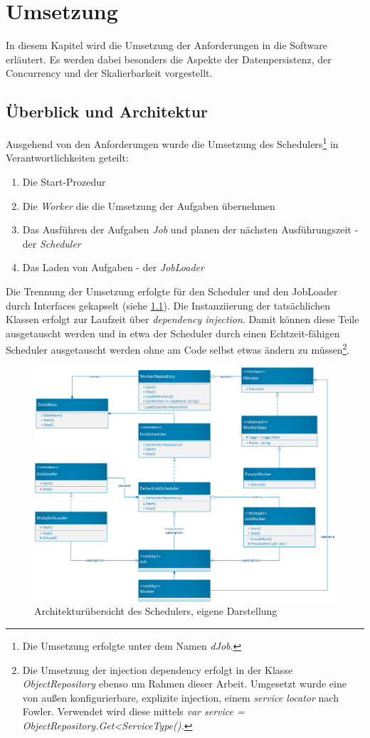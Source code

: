 \chapter{Umsetzung}\label{chap:Umsetzung}
\chapterstart
In diesem Kapitel wird die Umsetzung der Anforderungen in die Software erläutert. Es werden dabei besonders die Aspekte der Datenpersistenz, der Concurrency und der Skalierbarkeit vorgestellt.
\section{Überblick und Architektur}
Ausgehend von den Anforderungen wurde die Umsetzung des Schedulers\footnote{Die Umsetzung erfolgte unter dem Namen \textit{dJob}.} in Verantwortlichkeiten geteilt:
\begin{enumerate}
	\item Die Start-Prozedur
	\item Die \textit{Worker} die die Umsetzung der Aufgaben übernehmen
	\item Das Ausführen der Aufgaben \textit{Job} und planen der nächsten Ausführungszeit - der \textit{Scheduler}
	\item Das Laden von Aufgaben - der \textit{JobLoader}
\end{enumerate}
Die Trennung der Umsetzung erfolgte für den Scheduler und den JobLoader durch Interfaces gekapselt (siehe \ref{fig:architecture}). Die Instanziierung der tatsächlichen Klassen erfolgt zur Laufzeit über \textit{dependency injection}\cite{fowler2004}. Damit können diese Teile ausgetauscht werden und in etwa der Scheduler durch einen Echtzeit-fähigen Scheduler ausgetauscht werden ohne am Code selbst etwas ändern zu müssen\footnote{Die Umsetzung der injection dependency erfolgt in der Klasse \textit{ObjectRepository} ebenso um Rahmen dieser Arbeit. Umgesetzt wurde eine von außen konfigurierbare, explizite injection, einem \textit{service locator} nach Fowler. Verwendet wird diese mittels \textit{var service = ObjectRepository.Get<ServiceType().}}.
\begin{figure}
	\centering
	\includegraphics[width=0.7\linewidth]{images/architecture.png}
	\caption{Architekturübersicht des Schedulers, eigene Darstellung}
	\label{fig:architecture}
\end{figure}
